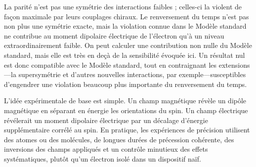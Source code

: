 \begin{classroomqa}
\end{classroomqa}

\begin{classroomqa}
\end{classroomqa}

La parité n’est pas une symétrie des interactions faibles ; celles-ci la violent de façon maximale par leurs couplages chiraux. Le renversement du temps n’est pas non plus une symétrie exacte, mais la violation connue dans le Modèle standard ne contribue au moment dipolaire électrique de l’électron qu’à un niveau extraordinairement faible. On peut calculer une contribution non nulle du Modèle standard, mais elle est très en deçà de la sensibilité évoquée ici. Un résultat nul est donc compatible avec le Modèle standard, tout en contraignant les extensions---la supersymétrie et d’autres nouvelles interactions, par exemple---susceptibles d’engendrer une violation beaucoup plus importante du renversement du temps.

L’idée expérimentale de base est simple. Un champ magnétique révèle un dipôle magnétique en séparant en énergie les orientations du spin. Un champ électrique révélerait un moment dipolaire électrique par un décalage d’énergie supplémentaire corrélé au spin. En pratique, les expériences de précision utilisent des atomes ou des molécules, de longues durées de précession cohérente, des inversions des champs appliqués et un contrôle minutieux des effets systématiques, plutôt qu’un électron isolé dans un dispositif naïf.

